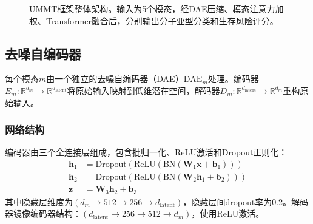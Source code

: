 \documentclass[conference]{IEEEtran}
\begin{document}
\begin{figure}[htbp]
\centering
{}
\caption{UMMT框架整体架构。输入为5个模态，经DAE压缩、模态注意力加权、Transformer融合后，分别输出分子亚型分类和生存风险评分。}
\label{fig:architecture}
\end{figure}

\subsection{去噪自编码器}
\label{sec:dae}

每个模态$m$由一个独立的去噪自编码器（DAE）$\text{DAE}_m$处理。编码器$E_m: \mathbb{R}^{d_m} \to \mathbb{R}^{d_{\text{latent}}}$将原始输入映射到低维潜在空间，解码器$D_m: \mathbb{R}^{d_{\text{latent}}} \to \mathbb{R}^{d_m}$重构原始输入。

\subsubsection{网络结构}

编码器由三个全连接层组成，包含批归一化、ReLU激活和Dropout正则化：
\begin{equation}
\begin{aligned}
\mathbf{h}_1 &= \text{Dropout}(\text{ReLU}(\text{BN}(\mathbf{W}_1 \mathbf{x} + \mathbf{b}_1))) \\
\mathbf{h}_2 &= \text{Dropout}(\text{ReLU}(\text{BN}(\mathbf{W}_2 \mathbf{h}_1 + \mathbf{b}_2))) \\
\mathbf{z} &= \mathbf{W}_3 \mathbf{h}_2 + \mathbf{b}_3
\end{aligned}
\end{equation}
其中隐藏层维度为$(d_m \to 512 \to 256 \to d_{\text{latent}})$，隐藏层间dropout率为0.2。解码器镜像编码器结构：$(d_{\text{latent}} \to 256 \to 512 \to d_m)$，使用ReLU激活。
\end{document}

